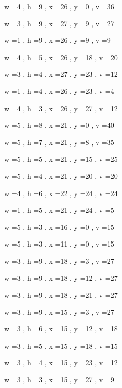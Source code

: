 \documentclass[11pt]{article}
\begin{document}


w =4 , h =9 , x =26 , y =0 , v =36
\par
w =3 , h =9 , x =27 , y =9 , v =27
\par
w =1 , h =9 , x =26 , y =9 , v =9
\par
w =4 , h =5 , x =26 , y =18 , v =20
\par
w =3 , h =4 , x =27 , y =23 , v =12
\par
w =1 , h =4 , x =26 , y =23 , v =4
\par
w =4 , h =3 , x =26 , y =27 , v =12
\par
w =5 , h =8 , x =21 , y =0 , v =40
\par
w =5 , h =7 , x =21 , y =8 , v =35
\par
w =5 , h =5 , x =21 , y =15 , v =25
\par
w =5 , h =4 , x =21 , y =20 , v =20
\par
w =4 , h =6 , x =22 , y =24 , v =24
\par
w =1 , h =5 , x =21 , y =24 , v =5
\par
w =5 , h =3 , x =16 , y =0 , v =15
\par
w =5 , h =3 , x =11 , y =0 , v =15
\par
w =3 , h =9 , x =18 , y =3 , v =27
\par
w =3 , h =9 , x =18 , y =12 , v =27
\par
w =3 , h =9 , x =18 , y =21 , v =27
\par
w =3 , h =9 , x =15 , y =3 , v =27
\par
w =3 , h =6 , x =15 , y =12 , v =18
\par
w =3 , h =5 , x =15 , y =18 , v =15
\par
w =3 , h =4 , x =15 , y =23 , v =12
\par
w =3 , h =3 , x =15 , y =27 , v =9
\par
\newpage
\end{document}
